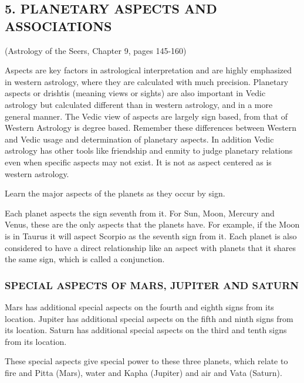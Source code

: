  

 



 

\subsection{5. PLANETARY ASPECTS AND ASSOCIATIONS} (Astrology of the Seers, Chapter 9, pages 145-160)
 

Aspects are key factors in astrological interpretation and are highly emphasized in western astrology, where they are calculated with much precision. Planetary aspects or drishtis (meaning views or sights) are also important in Vedic astrology but calculated different than in western astrology, and in a more general manner. The Vedic view of aspects are largely sign based, from that of Western Astrology is degree based. Remember these differences between Western and Vedic usage and determination of planetary aspects. In addition Vedic astrology has other tools like friendship and enmity to judge planetary relations even when specific aspects may not exist. It is not as aspect centered as is western astrology.

 

Learn the major aspects of the planets as they occur by sign.

 

Each planet aspects the sign seventh from it.
For Sun, Moon, Mercury and Venus, these are the only aspects that the planets have.
For example, if the Moon is in Taurus it will aspect Scorpio as the seventh sign from it.
Each planet is also considered to have a direct relationship like an aspect with planets that it shares the same sign, which is called a conjunction.
 

\subsubsection{SPECIAL ASPECTS OF MARS, JUPITER AND SATURN}

 

Mars has additional special aspects on the fourth and eighth signs from its location.
Jupiter has additional special aspects on the fifth and ninth signs from its location.
Saturn has additional special aspects on the third and tenth signs from its location.
 

These special aspects give special power to these three planets, which relate to fire and Pitta (Mars), water and Kapha (Jupiter) and air and Vata (Saturn).

